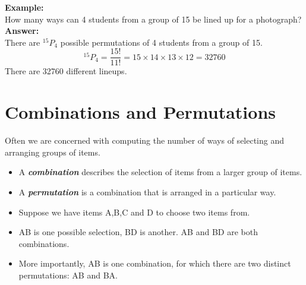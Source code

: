 \documentclass[12pt]{report}
\begin{document}
	
	
	\textbf{Example:}\\	
	How many ways can 4 students from a group of 15 be lined up for a photograph?\\
	\bigskip
	\textbf{Answer:	}\\
	There are $^{15}P_4$ possible permutations of 4 students from a group of 15.
	\[ ^{15}P_4 = \frac{15!}{11!} = 15\times 14\times 13\times 12 = 32760 \]
	There are 32760 different lineups.
	

	\section{Combinations and Permutations }


	
	{\Large
		
		
		Often we are concerned with computing the number of ways of selecting and arranging groups of items. \begin{itemize} \item  A \textbf{\emph{combination}} describes the selection of items from a larger group of items.  \item A \textbf{\emph{permutation}} is a combination that is arranged in a particular way.
		\end{itemize}
		
		\bigskip
		\begin{itemize}
			\item Suppose we have items A,B,C and D to choose two items from.
			\item AB is one possible selection, BD is another. AB and BD are both combinations.
			\item More importantly, AB is one combination, for which there are two distinct permutations: AB and BA.
		\end{itemize}
	}
	
\end{document}
